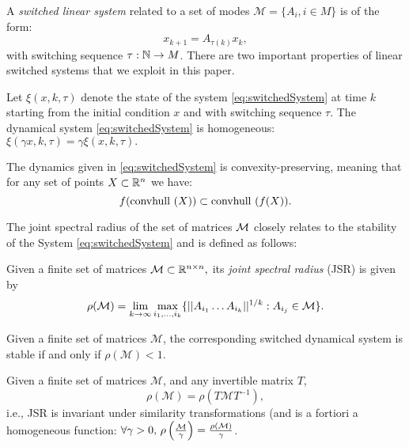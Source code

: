 A \emph{switched linear system} related to a set of modes $\mathcal{M}= \{A_i, i \in M \}$ is of the form:
\begin{equation}\label{eq:switchedSystem}x_{k+1} = A_{\tau(k)}x_k,\end{equation}
with switching sequence $\tau: \mathbb{N} \to M$. There are two important properties of linear switched systems that we exploit in this paper.
\begin{property}\label{property:homogeneity}
Let $\xi(x, k, \tau)$ denote the state of the system \eqref{eq:switchedSystem} at time $k$ starting from the initial condition $x$ and with switching sequence $\tau$. The dynamical system \eqref{eq:switchedSystem} is homogeneous: $\xi(\gamma x, k, \tau)= \gamma \xi(x, k, \tau).$
\end{property}
\begin{property}\label{property:convpres}
The dynamics given in \eqref{eq:switchedSystem} is convexity-preserving, meaning that for any set of points $X \subset \mathbb{R}^n$ we have:
$$ f(\mbox{convhull }({X}))\subset \mbox{convhull }(f(X)). $$
\end{property}

The joint spectral radius of the set of matrices $\mathcal{M}$ closely relates to the stability of the System \eqref{eq:switchedSystem} and is defined as follows:
\begin{definition} \cite{jungers_lncis} Given a finite set of matrices $\mathcal{M} \subset \mathbb{R}^{n\times n},$ its \emph{joint spectral radius} (JSR) is given by
$$\rho(\mathcal{M}) =\lim_{k\rightarrow \infty} \max_{i_1,\dots, i_k}\{||A_{i_1} \dots A_{i_k}||^{1/k}: A_{i_j}\in\mathcal{M}\}. $$
\end{definition}

\begin{property}
Given a finite set of matrices $\mathcal{M}$, the corresponding switched dynamical system is stable if and only if $\rho(\mathcal{M})<1$.
\end{property}

\begin{property}\label{rem:scaling}
Given a finite set of matrices $\mathcal{M}$, and any invertible matrix $T$, 
$$\rho(\mathcal{M})=\rho(T \mathcal{M} T^{-1}),$$
i.e., JSR is invariant under similarity transformations (and is a fortiori a homogeneous function: $\forall \gamma > 0,\, \rho\left(\frac{\mathcal{M}}{\gamma}\right)=\frac{\rho(\mathcal{M})}{\gamma}$.
\end{property}

